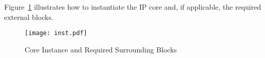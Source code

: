Figure~\ref{fig:inst} illustrates how to instantiate the IP core and, if applicable, the
required external blocks.

\begin{figure}[!htbp]
    \centerline{\texttt{[image: inst.pdf]}}
    \vspace{0cm}\caption{Core Instance and Required Surrounding Blocks}
    \label{fig:inst}
\end{figure}



